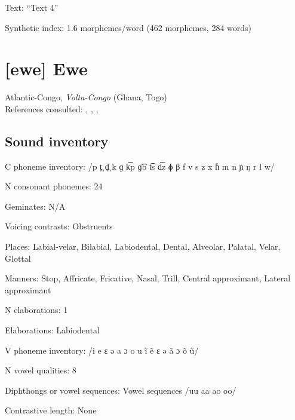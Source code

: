 {\begin{appendixdesc}
\item[Text:] “Text 4” \citep[906--912]{Hualde2003}

\item[Synthetic index:] 1.6 morphemes/word (462 morphemes, 284 words)
\end{appendixdesc}
\section*{[ewe] Ewe}   %
Atlantic-Congo, \textit{Volta-Congo} (Ghana, Togo)\medskip\\
References consulted: \citet{Ameka1991}, \citet{Duthie1996}, \citet{Jalloh2005}, \citet{Stahlke1971}

\subsection*{Sound inventory}
\begin{appendixdesc}

\item[C phoneme inventory:] /p t̪ d̪ k ɡ k͡p ɡ͡b t͡s d͡z ɸ β f v s z x ɦ m n ɲ ŋ r l w/

\item[N consonant phonemes:] 24

\item[Geminates:] N/A

\item[Voicing contrasts:] Obstruents

\item[Places:] Labial-velar, Bilabial, Labiodental, Dental, Alveolar, Palatal, Velar, Glottal

\item[Manners:] Stop, Affricate, Fricative, Nasal, Trill, Central approximant, Lateral approximant

\item[N elaborations:] 1

\item[Elaborations:] Labiodental

\item[V phoneme inventory:] /i e ɛ ə a ɔ o u ĩ ẽ ɛ ə ã ɔ õ ũ/

\item[N vowel qualities:] 8

\item[Diphthongs or vowel sequences:] Vowel sequences /uu aa ao oo/

\item[Contrastive length:] None


\end{appendixdesc}}
